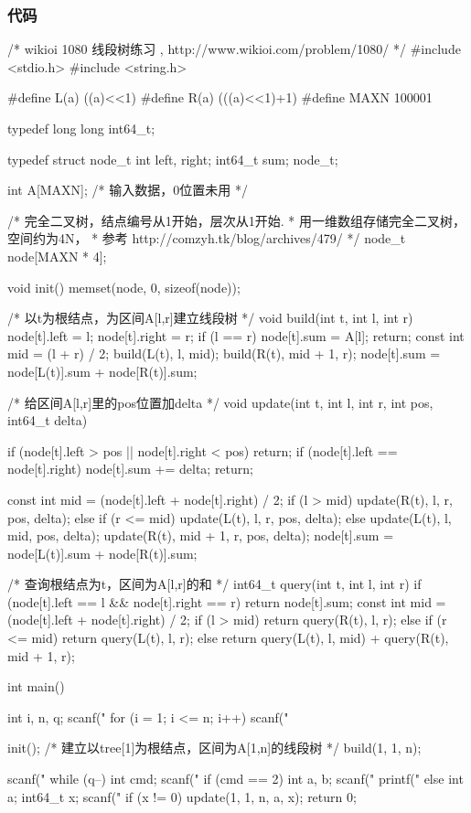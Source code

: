 \subsubsection{代码}
\begin{Codex}[label=interval_tree1.c]
/* wikioi 1080 线段树练习 , http://www.wikioi.com/problem/1080/ */
#include <stdio.h>
#include <string.h>

#define L(a) ((a)<<1)
#define R(a) (((a)<<1)+1)
#define MAXN 100001

typedef long long int64_t;

typedef struct node_t {
    int left, right;
    int64_t sum;
} node_t;

int A[MAXN]; /* 输入数据，0位置未用 */

/* 完全二叉树，结点编号从1开始，层次从1开始.
 * 用一维数组存储完全二叉树，空间约为4N，
 * 参考 http://comzyh.tk/blog/archives/479/
 */
node_t node[MAXN * 4];

void init() {
    memset(node, 0, sizeof(node));
}

/* 以t为根结点，为区间A[l,r]建立线段树 */
void build(int t, int l, int r) {
    node[t].left = l;
    node[t].right = r;
    if (l == r) {
        node[t].sum = A[l];
        return;
    }
    const int mid = (l + r) / 2;
    build(L(t), l, mid);
    build(R(t), mid + 1, r);
    node[t].sum = node[L(t)].sum + node[R(t)].sum;
}

/* 给区间A[l,r]里的pos位置加delta */
void update(int t, int l, int r, int pos, int64_t delta) {
    if (node[t].left > pos || node[t].right < pos) return;
    if (node[t].left == node[t].right) {
        node[t].sum += delta;
        return;
    }

    const int mid = (node[t].left + node[t].right) / 2;
    if (l > mid) update(R(t), l, r, pos, delta);
    else if (r <= mid) update(L(t), l, r, pos, delta);
    else {
        update(L(t), l, mid, pos, delta);
        update(R(t), mid + 1, r, pos, delta);
    }
    node[t].sum = node[L(t)].sum + node[R(t)].sum;
}

/* 查询根结点为t，区间为A[l,r]的和 */
int64_t query(int t, int l, int r) {
    if (node[t].left == l && node[t].right == r)
        return node[t].sum;
    const int mid = (node[t].left + node[t].right) / 2;
    if (l > mid) return query(R(t), l, r);
    else if (r <= mid) return query(L(t), l, r);
    else return query(L(t), l, mid) + query(R(t), mid + 1, r);
}

int main() {
    int i, n, q;
    scanf("%
    for (i = 1; i <= n; i++) scanf("%

    init();
    /* 建立以tree[1]为根结点，区间为A[1,n]的线段树 */
    build(1, 1, n);

    scanf("%
    while (q--) {
        int cmd;
        scanf("%
        if (cmd == 2) {
            int a, b;
            scanf("%
            printf("%
        } else {
            int a;
            int64_t x;
            scanf("%
            if (x != 0) update(1, 1, n, a, x);
        }
    }
    return 0;
}
\end{Codex}

